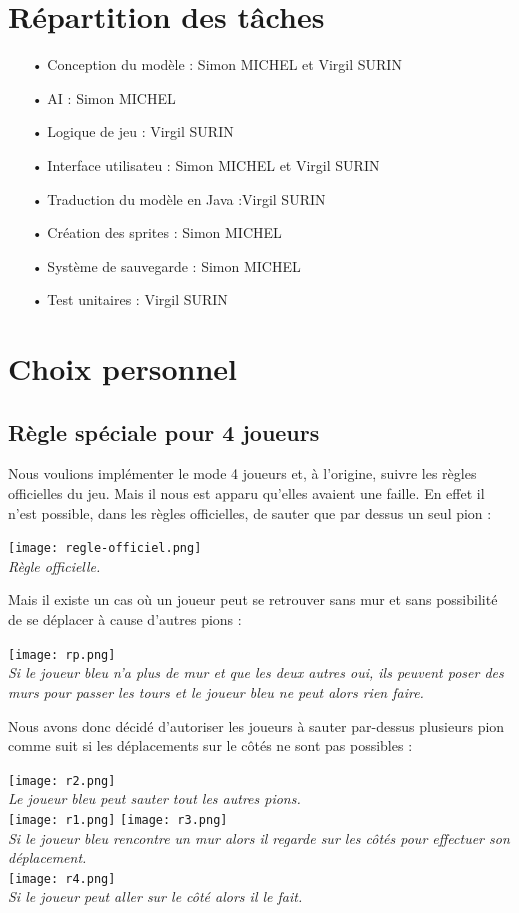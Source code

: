 \documentclass[a4paper, 12pt]{article}
\begin{document}
\section{Répartition des tâches}
\begin{itemize}
\item[•] Conception du modèle : Simon MICHEL et Virgil SURIN
\item[•] AI : Simon MICHEL
\item[•] Logique de jeu : Virgil SURIN
\item[•] Interface utilisateu : Simon MICHEL et Virgil SURIN
\item[•] Traduction du modèle en Java :Virgil SURIN
\item[•] Création des sprites : Simon MICHEL
\item[•] Système de sauvegarde : Simon MICHEL
\item[•] Test unitaires : Virgil SURIN
\end{itemize}

\section{Choix personnel}

\subsection{Règle spéciale pour 4 joueurs}
Nous voulions implémenter le mode 4 joueurs et, à l'origine, suivre les règles officielles du jeu. Mais il nous est apparu qu'elles avaient une faille. En effet il n'est possible, dans les règles officielles, de sauter que par dessus un seul pion :
\begin{center}
\texttt{[image: regle-officiel.png]} \\
\textit{Règle officielle.}
\end{center}

Mais il existe un cas où un joueur peut se retrouver sans mur et sans possibilité de se déplacer à cause d'autres pions :
\begin{center}
\texttt{[image: rp.png]} \\
\textit{Si le joueur bleu n'a plus de mur et que les deux autres oui, ils peuvent poser des murs pour passer les tours et le joueur bleu ne peut alors rien faire.}
\end{center}
Nous avons donc décidé d'autoriser les joueurs à sauter par-dessus plusieurs pion comme suit si les déplacements sur le côtés ne sont pas possibles :
\begin{center}
\texttt{[image: r2.png]} \\
\textit{Le joueur bleu peut sauter tout les autres pions.} \\
\texttt{[image: r1.png]}
\texttt{[image: r3.png]} \\
\textit{Si le joueur bleu rencontre un mur alors il regarde sur les côtés pour effectuer son déplacement.} \\
\texttt{[image: r4.png]} \\
\textit{Si le joueur peut aller sur le côté alors il le fait.}
\end{center}
\end{document}
